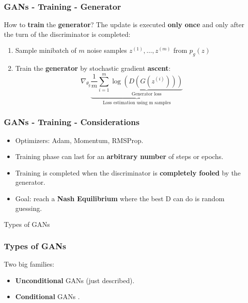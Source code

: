 \documentclass{beamer}
\begin{document}
\begin{frame}
	\frametitle{GANs - Training - Generator}
	How to \textbf{train} the \textbf{generator}? \newline
	The update is executed \textbf{only once} and only after the turn of the discriminator is completed:
	\begin{enumerate}
		\item Sample minibatch of $m$ noise samples ${z^{(1)},\dots,z^{(m)}}$ from $p_g(z)$
		\item Train the \textbf{generator} by stochastic gradient \textbf{ascent}:
			$$
			\nabla_{\theta_g} \underbrace{\frac{1}{m} \sum_{i=1}^{m} \underbrace{\log(D(G(z^{(i)})))}_{\text{Generator loss}}}_{\text{Loss estimation using m samples}}
			$$
	\end{enumerate}
\end{frame} 

\begin{frame}
	\frametitle{GANs - Training - Considerations}
	\begin{itemize}
		\item Optimizers: Adam, Momentum, RMSProp.
		\item Training phase can last for an \textbf{arbitrary number} of steps or epochs.
		\item Training is completed when the discriminator is \textbf{completely fooled} by the generator.
		\item Goal: reach a \textbf{Nash Equilibrium} where the best D can do is random guessing.
	\end{itemize}
 \end{frame}

\begin{frame}[standout]
	Types of GANs
\end{frame}

\begin{frame}
	\frametitle{Types of GANs}
	Two big families:
	\begin{itemize}
		\item \textbf{Unconditional} GANs (just described).
		\item \textbf{Conditional} GANs \citep{mirzaConditionalGenerativeAdversarial2014}.
	\end{itemize}
\end{frame}
\end{document}
